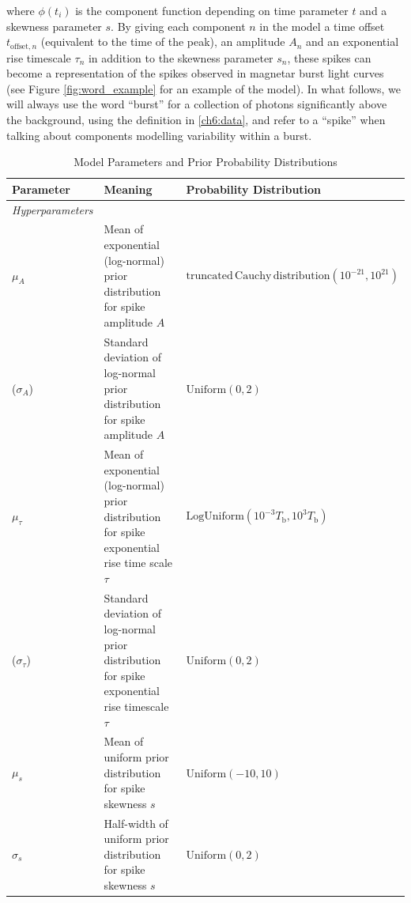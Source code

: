 \documentclass[12pt]{emulateapj}
\newcommand{\word}{\phi}
\begin{document}
where $\word(t_i)$ is the component function depending on time parameter $t$ and a skewness
parameter $s$. By giving each component $n$ in the model a time offset $t_{\mathrm{offset},n}$ (equivalent to the time of the peak), 
an amplitude $A_n$ and an exponential rise timescale $\tau_n$ in addition to the skewness parameter $s_n$, 
these spikes can become a representation of the spikes observed in magnetar burst light curves (see Figure \ref{fig:word_example}
for an example of the model). In what follows, we will always use the word ``burst'' for a collection of photons significantly above the background,
using the definition in \ref{ch6:data}, and refer to a ``spike'' when talking about components modelling variability within a burst. 
\begin{table}[hbtp]
\renewcommand{\arraystretch}{1.3}
\footnotesize
\caption{Model Parameters and Prior Probability Distributions}
\begin{threeparttable} 
\begin{tabularx}{\textwidth}{p{2.0cm}p{10.0cm}X}%
\toprule
\bf{Parameter} & \bf{Meaning} & \bf{Probability Distribution} \\ \midrule
\it{Hyperparameters} && \\ \midrule
$\mu_A$ & Mean of exponential (log-normal) prior distribution for spike amplitude $A$ &  $\mathrm{truncated\, Cauchy\, distribution}(10^{-21}, 10^{21})$  \\
($\sigma_A$)\footnotemark[1] & Standard deviation of log-normal prior distribution for spike amplitude $A$ & $\mathrm{Uniform}(0,2)$ \\
$\mu_\tau$ & Mean of exponential (log-normal) prior distribution for spike exponential rise time scale $\tau$& $\mathrm{LogUniform}(10^{-3}T_\mathrm{b}, 10^3{T_\mathrm{b}})$\tnote{\emph{b}}  \\
($\sigma_\tau$)\footnotemark[1]  & Standard deviation of log-normal prior distribution for spike exponential rise timescale $\tau$& $\mathrm{Uniform}(0,2)$\\
$\mu_s$ & Mean of uniform prior distribution for spike skewness $s$ & $\mathrm{Uniform}(-10, 10)$ \\
$\sigma_s$ & Half-width of uniform prior distribution for spike skewness $s$& $\mathrm{Uniform}(0,2)$\\ \midrule

\end{tabularx}
\end{threeparttable}
\end{table}
\end{document}
